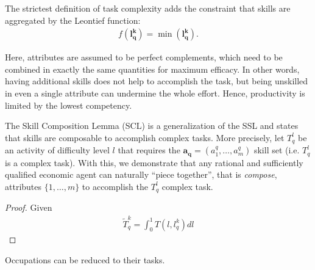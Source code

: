 \documentclass[hidelinks, nonatbib]{elsarticle}
\begin{document}
\begin{definition}
    \begin{subdefinition}
        The strictest definition of task complexity adds the constraint that skills are aggregated by the Leontief function:
        \begin{gather}
            f(\boldsymbol{l_{q}^{k}}) = 
            \min(\boldsymbol{l_{q}^{k}})
            .
        \end{gather}

        Here, attributes are assumed to be perfect complements, which need to be combined in exactly the same quantities for maximum efficacy. In other words, having additional skills does not help to accomplish the task, but being unskilled in even a single attribute can undermine the whole effort. Hence, productivity is limited by the lowest competency.
    \end{subdefinition}

\end{definition}
\begin{lemma}
    \label{scl}
    The Skill Composition Lemma (SCL) is a generalization of the SSL and states that skills are composable to accomplish complex tasks. More precisely, let $T_{q}^{l}$ be an activity of difficulty level $l$ that requires the $\boldsymbol{a_q} = (a_{1}^{q}, \dots, a_{m}^{q})$ skill set (i.e. $T_{q}^{l}$ is a complex task). With this, we demonstrate that any rational and sufficiently qualified economic agent can naturally ``piece together'', that is \textit{compose}, attributes $\{1, \dots, m\}$ to accomplish the $T_{q}^{l}$ complex task.
    
    \begin{proof}
        Given 
        \begin{gather}
            \tilde{T}_{q}^{k} = 
            \int_{0}^{1}{
                T(l, l_{q}^{k})
                dl
            }
        \end{gather}
    \end{proof}
\end{lemma}
\label{ora}
\begin{axiom}
    Occupations can be reduced to their tasks.
\end{axiom}
\end{document}
